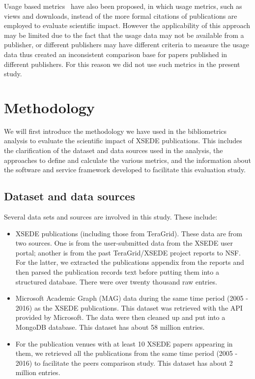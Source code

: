 \documentclass{sig-alternate}
\begin{document}
Usage based
metrics~\cite{Bollen:2007:MUM:1255175.1255273,Bollen:2008:TUI:1378889.1378928}
have also been proposed, in which usage metrics, such as views and
downloads, instead of the more formal citations of publications are
employed to evaluate scientific impact. However the applicability of
this approach may be limited due to the fact that the usage data may
not be available from a publisher, or different publishers may have
different criteria to measure the usage data thus created an
inconsistent comparison base for papers published in different
publishers.  For this reason we did not use such metrics in the
present study.

\section{Methodology} \label{S:methodology}

We will first introduce the methodology we have used in the
bibliometrics analysis to evaluate the scientific impact of XSEDE
publications. This includes the clarification of the dataset and data
sources used in the analysis, the approaches to define and calculate
the various metrics, and the information about the software and
service framework developed to facilitate this evaluation study.

\subsection{Dataset and data sources}

Several data sets and sources are involved in this study. These
include:

\begin{itemize}
\item XSEDE publications (including those from TeraGrid). These data
  are from two sources. One is from the user-submitted data from the
  XSEDE user portal; another is from the past TeraGrid/XSEDE project
  reports to NSF. For the latter, we extracted the publications
  appendix from the reports and then parsed the publication records
  text before putting them into a structured database. There were over
  twenty thousand raw entries.
\item Microsoft Academic Graph (MAG) data during the same time period
  (2005 - 2016) as the XSEDE publications. This dataset was retrieved
  with the API provided by Microsoft. The data were then cleaned up
  and put into a MongoDB database. This dataset has about 58 million
  entries.
\item For the publication venues with at least 10 XSEDE papers
  appearing in them, we retrieved all the publications from the same
  time period (2005 - 2016) to facilitate the peers comparison
  study. This dataset has about 2 million entries.
\end{itemize}
\end{document}

